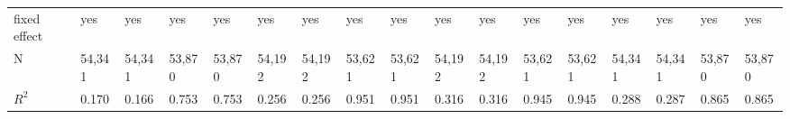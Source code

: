 \begin{tabular}{lllllllllllllllll}
fixed effect                 &                               yes &                               yes &                               yes &                               yes &                               yes &                               yes &                               yes &                               yes &                               yes &                               yes &                               yes &                               yes &                               yes &                              yes &                              yes &                              yes \\
N                            &                            54,341 &                            54,341 &                            53,870 &                            53,870 &                            54,192 &                            54,192 &                            53,621 &                            53,621 &                            54,192 &                            54,192 &                            53,621 &                            53,621 &                            54,341 &                           54,341 &                           53,870 &                           53,870 \\
$R^2$                        &                             0.170 &                             0.166 &                             0.753 &                             0.753 &                             0.256 &                             0.256 &                             0.951 &                             0.951 &                             0.316 &                             0.316 &                             0.945 &                             0.945 &                             0.288 &                            0.287 &                            0.865 &                            0.865 \\
\bottomrule
\end{tabular}
